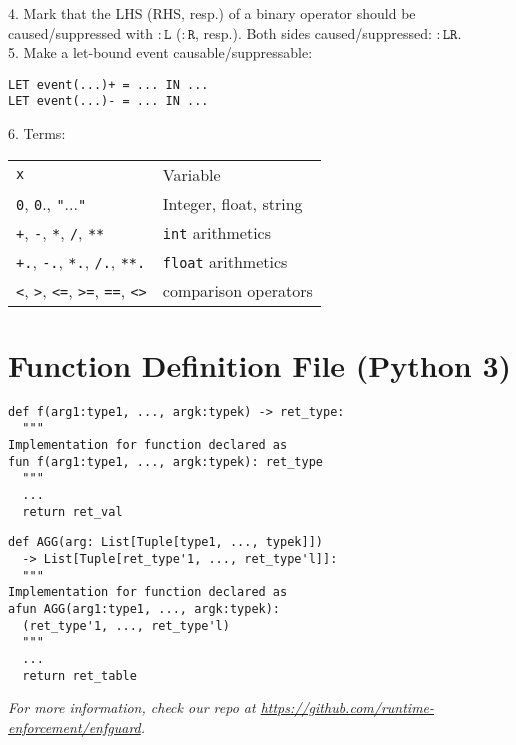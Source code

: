 \documentclass[a4paper,9pt]{extarticle}
\begin{document}
\begin{multicols}{2}
\begin{tcolorbox}
  4. Mark that the LHS (RHS, resp.) of a binary operator should be caused/suppressed
  with $\mathtt{:L}$ ($\mathtt{:R}$, resp.). Both sides caused/suppressed: $\mathtt{:LR}$.\\[5pt]
  5. Make a let-bound event causable/suppressable:
\begin{verbatim}
LET event(...)+ = ... IN ...
LET event(...)- = ... IN ...
\end{verbatim}
  6. Terms:\\
  \begin{tabular}{ll}
    \texttt{x} & Variable \\
    \texttt{0}, \texttt{0}., \texttt{"}...\texttt{"} & Integer, float, string \\
    \texttt{+}, \texttt{-}, \texttt{*}, \texttt{/}, \texttt{**} & \texttt{int} arithmetics \\
    \texttt{+.}, \texttt{-.}, \texttt{*.}, \texttt{/.}, \texttt{**.} & \texttt{float} arithmetics \\
    \texttt{<}, \texttt{>}, \texttt{<=}, \texttt{>=}, \texttt{==}, \texttt{<>}& comparison operators
  \end{tabular}
\end{tcolorbox}

\section{Function Definition File (Python 3)}
\begin{tcolorbox}
\begin{verbatim}
def f(arg1:type1, ..., argk:typek) -> ret_type:
  """
Implementation for function declared as
fun f(arg1:type1, ..., argk:typek): ret_type
  """
  ...
  return ret_val
\end{verbatim}
\begin{verbatim}
def AGG(arg: List[Tuple[type1, ..., typek]])
  -> List[Tuple[ret_type'1, ..., ret_type'l]]:
  """
Implementation for function declared as
afun AGG(arg1:type1, ..., argk:typek):
  (ret_type'1, ..., ret_type'l)
  """
  ...
  return ret_table
\end{verbatim}
\end{tcolorbox}

\end{multicols}

\vspace{0.5em}
\begin{center}
    \textit{For more information, check our repo at \url{https://github.com/runtime-enforcement/enfguard}.}
\end{center}
\end{document}
